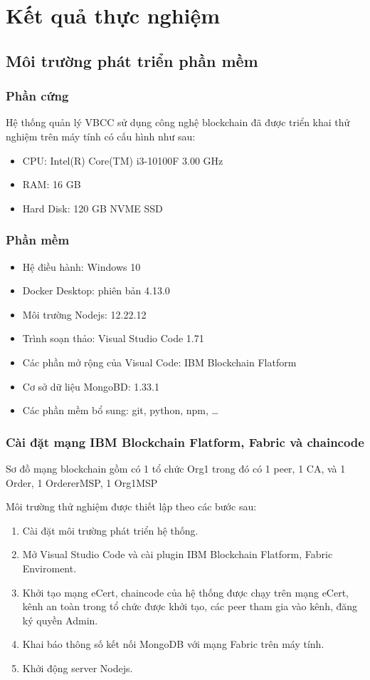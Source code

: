 \chapter{Kết quả thực nghiệm}
\section{Môi trường phát triển phần mềm}
\subsection{Phần cứng}

Hệ thống quản lý VBCC sử dụng công nghệ blockchain đã được triển khai thử nghiệm trên máy tính có cấu hình như sau:
\begin{itemize}
\item CPU: Intel(R) Core(TM) i3-10100F 3.00 GHz
\item RAM: 16 GB
\item Hard Disk: 120 GB NVME SSD
\end{itemize}

\subsection{Phần mềm}
\begin{itemize}
\item Hệ điều hành: Windows 10
\item Docker Desktop: phiên bản 4.13.0
\item Môi trường Nodejs: 12.22.12
\item Trình soạn thảo: Visual Studio Code 1.71
\item Các phần mở rộng của Visual Code: IBM Blockchain Flatform
\item Cơ sở dữ liệu MongoBD: 1.33.1
\item Các phần mềm bổ sung: git, python, npm, \ldots
\end{itemize}

\subsection{Cài đặt mạng IBM Blockchain Flatform, Fabric và chaincode}

Sơ đồ mạng blockchain gồm có 1 tổ chức Org1 trong đó có 1 peer, 1 CA, và 1 Order, 1 OrdererMSP, 1 Org1MSP
 
Môi trường thử nghiệm được thiết lập theo các bước sau:
\begin{enumerate}
\item Cài đặt môi trường phát triển hệ thống.
\item Mở Visual Studio Code và cài plugin IBM Blockchain Flatform, Fabric Enviroment.
\item Khởi tạo mạng eCert, chaincode của hệ thống được chạy trên mạng eCert, kênh an toàn trong tổ chức được khởi tạo, các peer tham gia vào kênh, đăng ký quyền Admin.
\item Khai báo thông số kết nối MongoDB với mạng Fabric trên máy tính.
\item Khởi động server Nodejs.
\end{enumerate}


